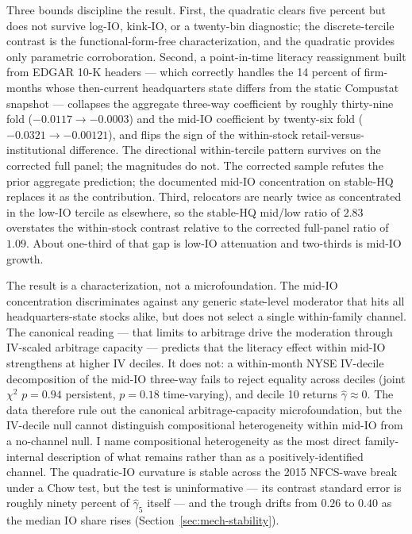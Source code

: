 Three bounds discipline the result. First, the quadratic clears five percent but does not survive log-IO, kink-IO, or a twenty-bin diagnostic; the discrete-tercile contrast is the functional-form-free characterization, and the quadratic provides only parametric corroboration. Second, a point-in-time literacy reassignment built from EDGAR 10-K headers --- which correctly handles the 14 percent of firm-months whose then-current headquarters state differs from the static Compustat snapshot --- collapses the aggregate three-way coefficient by roughly thirty-nine fold ($-0.0117 \to -0.0003$) and the mid-IO coefficient by twenty-six fold ($-0.0321 \to -0.00121$), and flips the sign of the within-stock retail-versus-institutional difference. The directional within-tercile pattern survives on the corrected full panel; the magnitudes do not. The corrected sample refutes the prior aggregate prediction; the documented mid-IO concentration on stable-HQ replaces it as the contribution. Third, relocators are nearly twice as concentrated in the low-IO tercile as elsewhere, so the stable-HQ mid/low ratio of $2.83$ overstates the within-stock contrast relative to the corrected full-panel ratio of $1.09$. About one-third of that gap is low-IO attenuation and two-thirds is mid-IO growth.

The result is a characterization, not a microfoundation. The mid-IO concentration discriminates against any generic state-level moderator that hits all headquarters-state stocks alike, but does not select a single within-family channel. The canonical reading --- that limits to arbitrage drive the moderation through IV-scaled arbitrage capacity --- predicts that the literacy effect within mid-IO strengthens at higher IV deciles. It does not: a within-month NYSE IV-decile decomposition of the mid-IO three-way fails to reject equality across deciles (joint $\chi^{2}$ $p = 0.94$ persistent, $p = 0.18$ time-varying), and decile 10 returns $\hat\gamma \approx 0$. The data therefore rule out the canonical arbitrage-capacity microfoundation, but the IV-decile null cannot distinguish compositional heterogeneity within mid-IO from a no-channel null. I name compositional heterogeneity as the most direct family-internal description of what remains rather than as a positively-identified channel. The quadratic-IO curvature is stable across the 2015 NFCS-wave break under a Chow test, but the test is uninformative --- its contrast standard error is roughly ninety percent of $\hat\gamma_{5}$ itself --- and the trough drifts from $0.26$ to $0.40$ as the median IO share rises (Section~\ref{sec:mech-stability}).

